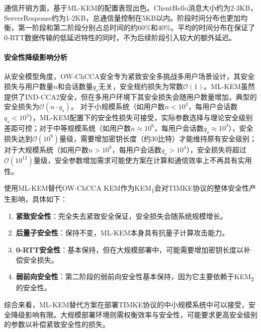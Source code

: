 通信开销方面，基于ML-KEM的配置表现出色。ClientHello消息大小约为2-3KB，ServerResponse约为1-2KB，总通信量控制在5KB以内。阶段时间分布也更加均衡，第一阶段和第二阶段分别占总时间的约60\%和40\%。平均的时间分布在保证了0-RTT数据传输的低延迟特性的同时，不为后续阶段引入较大的额外延迟。

\paragraph{安全性降级影响分析}
从安全模型角度，OW-ChCCA安全专为紧致安全多挑战多用户场景设计，其安全损失与用户数量$n$和会话数量$q_s$无关，安全规约损失为常数$\mathcal{O}(1)$。ML-KEM虽然提供了IND-CCA2安全，但在多用户环境下其安全损失会随用户数量增加，典型的安全损失为$\mathcal{O}(n \cdot q_s)$。
对于小规模系统（如用户数$n < 10^3$，每用户会话数$q_s < 10^3$），ML-KEM配置下的安全性损失可接受，实际参数选择与理论安全级别差距可控；对于中等规模系统（如用户数$n \approx 10^6$，每用户会话数$q_s \approx 10^3$），安全损失达到$\mathcal{O}(10^9)$量级，需要增加密钥长度（约30比特）才能维持原有安全级别；对于大规模系统（如用户数$n > 10^8$，每用户会话数$q_s > 10^4$），安全损失将超过$\mathcal{O}(10^{12})$量级，安全参数增加需求可能使方案在计算和通信效率上不再具有实用性。

使用ML-KEM替代OW-ChCCA KEM作为KEM\textsubscript{1}会对TIMKE协议的整体安全性产生影响，具体如下：

\begin{enumerate}
    \item \textbf{紧致安全性}：完全失去紧致安全保证，安全损失会随系统规模增长。
    
    \item \textbf{后量子安全性}：保持不变，ML-KEM本身具有抗量子计算攻击能力。
    
    \item \textbf{0-RTT安全性}：基本保持，但在大规模部署中，可能需要增加密钥长度以补偿安全损失。
    
    \item \textbf{弱前向安全性}：第二阶段的弱前向安全性基本保持，因为它主要依赖于KEM\textsubscript{2}的安全性。
\end{enumerate}

综合来看，ML-KEM替代方案在部署TIMKE协议的中小规模系统中可以接受，安全降级影响有限。大规模部署环境则需权衡效率与安全性，可能要求更高安全级别的参数以补偿紧致安全性的损失。